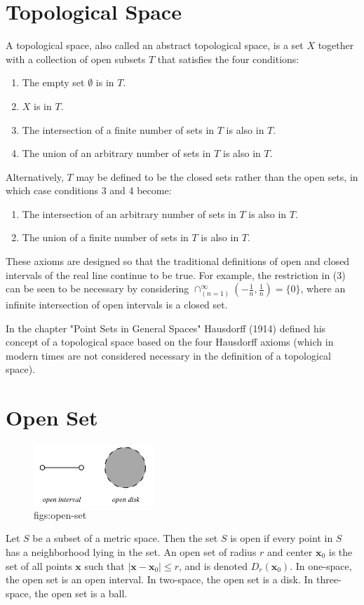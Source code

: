 \documentclass[lang=en,11pt,a4paper,cite=numbers]{elegantpaper}
\begin{document}
\section{Topological Space\cite{topological-space}}
\label{terms:topological-space}
  A topological space, also called an abstract topological space, is a set $X$ together with a collection of open subsets $T$ that satisfies the four conditions:
\begin{enumerate}
  \item The empty set $\emptyset$ is in $T$.
  \item $X$ is in $T$.
  \item The intersection of a finite number of sets in $T$ is also in $T$.
  \item The union of an arbitrary number of sets in $T$ is also in $T$.
\end{enumerate}
Alternatively, $T$ may be defined to be the closed sets rather than the open sets, in which case conditions 3 and 4 become:
\setcounter{counter}{2}
\begin{enumerate}[\thecounter.]
  \item The intersection of an arbitrary number of sets in $T$ is also in $T$.
  \item The union of a finite number of sets in $T$ is also in $T$.
\end{enumerate}
These axioms are designed so that the traditional definitions of open and closed intervals of the real line continue to be true. For example, the restriction in (3) can be seen to be necessary by considering  $\cap_{(n=1)}^{\infty}(-\frac{1}{n},\frac{1}{n})=\{0\}$, where an infinite intersection of open intervals is a closed set.

  In the chapter "Point Sets in General Spaces" Hausdorff (1914) defined his concept of a topological space based on the four Hausdorff axioms (which in modern times are not considered necessary in the definition of a topological space).

\section{Open Set\cite{open-set}}
\label{terms:open-set}
\begin{figure}[!htb]
  \centering
  \includegraphics[width=0.4\textwidth]{figs/open-set.png}
  \caption{figs:open-set}
  \label{figs:open-set}
\end{figure}
  Let $S$ be a subset of a metric space. Then the set $S$ is open if every point in $S$ has a neighborhood lying in the set. An open set of radius $r$ and center $\textbf{x}_{0}$ is the set of all points $\textbf{x}$ such that $\left|\textbf{x}-\textbf{x}_{0}\right|{\le}r$, and is denoted $D_{r}(\textbf{x}_{0})$. In one-space, the open set is an open interval. In two-space, the open set is a disk. In three-space, the open set is a ball.
\end{document}

